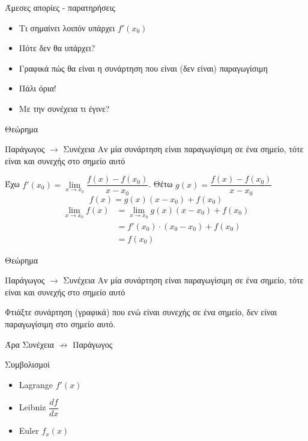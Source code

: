 \documentclass{presentation}
\begin{document}
\begin{frame}{Άμεσες απορίες - παρατηρήσεις}
    \begin{itemize}
        \item<1-> Τι σημαίνει λοιπόν υπάρχει $f'(x_0)$
        \item<2-> Πότε δεν θα υπάρχει?
        \item<3-> Γραφικά πώς θα είναι η συνάρτηση που είναι (δεν είναι) παραγωγίσιμη
        \item<4-> Πάλι όρια!
        \item<5-> Με την συνέχεια τι έγινε?
    \end{itemize}
\end{frame}

\begin{frame}{Θεώρημα}
    \begin{block}{Παράγωγος $\to$ Συνέχεια}
        Αν μία συνάρτηση είναι παραγωγίσιμη σε ένα σημείο, τότε είναι και συνεχής στο σημείο αυτό
    \end{block}
    Έχω $f'(x_0)=\lim\limits_{x \to x_0}{ \dfrac{f(x)-f(x_0)}{x-x_0} }$. Θέτω $g(x)=\dfrac{f(x)-f(x_0)}{x-x_0}$
    $$f(x)=g(x)(x-x_0)+f(x_0)$$
    \begin{align*}
        \lim\limits_{x \to x_0}{ f(x) } & =\lim\limits_{x \to x_0}{ g(x)(x-x_0)+f(x_0) } \\
                                        & =f'(x_0)\cdot (x_0-x_0)+f(x_0)                 \\
                                        & =f(x_0)
    \end{align*}
\end{frame}

\begin{frame}{Θεώρημα}
    \begin{block}{Παράγωγος $\to$ Συνέχεια}
        Αν μία συνάρτηση είναι παραγωγίσιμη σε ένα σημείο, τότε είναι και συνεχής στο σημείο αυτό
    \end{block}
     Φτιάξτε συνάρτηση (γραφικά) που ενώ είναι συνεχής σε ένα σημείο, δεν είναι παραγωγίσιμη στο σημείο αυτό.

     Άρα Συνέχεια $\nrightarrow$ Παράγωγος
\end{frame}

\begin{frame}{Συμβολισμοί}
    \begin{itemize}
        \item<1-> Lagrange $f'(x)$
        \item<2-> Leibniz $\dfrac{df}{dx}$
        \item<3-> Euler $f_x(x)$
    \end{itemize}
\end{frame}
\end{document}
